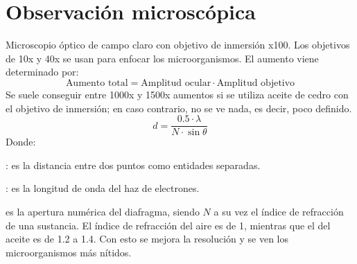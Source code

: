 \chapter{Observación microscópica}
Microscopio óptico de campo claro con objetivo de inmersión x100. Los objetivos de 10x y 40x se usan para enfocar los microorganismos. El aumento viene determinado por:
\begin{equation}
	\mbox{Aumento total} = \mbox{Amplitud ocular} \cdot \mbox{Amplitud objetivo}
\end{equation}
Se suele conseguir entre 1000x y 1500x aumentos si se utiliza aceite de cedro con el objetivo de inmersión; en caso contrario, no se ve nada, es decir, poco definido.
\begin{equation}
	d = \frac{0.5 \cdot \lambda}{N\cdot \sin \theta}
\end{equation}
Donde:
\begin{description}[itemsep=0pt,parsep=0pt,topsep=0pt,partopsep=0pt]
	\item[d]: es la distancia entre dos puntos como entidades separadas.
	\item[$\lambda$]: es la longitud de onda del haz de electrones.
	\item[$N \sin\theta$] es la apertura numérica del diafragma, siendo $N$ a su vez el índice de refracción de una sustancia. El índice de refracción del aire es de 1, mientras que el del aceite es de 1.2 a 1.4. Con esto se mejora la resolución y se ven los microorganismos más nítidos.
\end{description}

